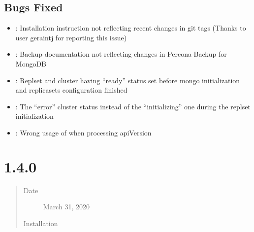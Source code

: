 \documentclass[letterpaper,10pt,english]{sphinxmanual}
\begin{document}
\subsection{Bugs Fixed}
\label{\detokenize{RN/Kubernetes-Operator-for-PSMONGODB-RN1.5.0:bugs-fixed}}\begin{itemize}
\item {} 
: Installation instruction not reflecting recent changes in git tags (Thanks to user geraintj for reporting this issue)

\item {} 
: Backup documentation not reflecting changes in Percona Backup for MongoDB

\item {} 
: Replset and cluster having “ready” status set before mongo initialization and replicasets configuration finished

\item {} 
: The “error” cluster status instead of the “initializing” one during the replset initialization

\item {} 
: Wrong usage of  when processing apiVersion

\end{itemize}


\section{ 1.4.0}
\label{\detokenize{RN/Kubernetes-Operator-for-PSMONGODB-RN1.4.0:percona-kubernetes-operator-for-percona-server-for-mongodb-1-4-0}}\label{\detokenize{RN/Kubernetes-Operator-for-PSMONGODB-RN1.4.0:k8spsmdb-1-4-0}}\label{\detokenize{RN/Kubernetes-Operator-for-PSMONGODB-RN1.4.0::doc}}\begin{quote}\begin{description}
\item[{Date}] \leavevmode
March 31, 2020

\item[{Installation}] \leavevmode
{}

\end{description}\end{quote}
\end{document}
